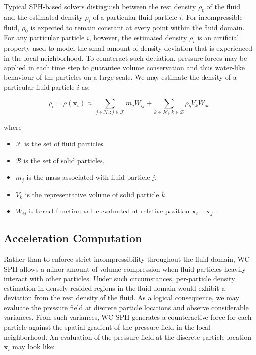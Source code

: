 \documentclass[
	11pt, 
	DIV10,
	ngerman,
	a4paper, 
	oneside, 
	headings=normal, 
	captions=tableheading,
	final, 
	numbers=noenddot
]{scrartcl}
\begin{document}
Typical SPH-based solvers distinguish between the rest density $ \rho_{0} $ of the fluid and the estimated density $ \rho_{i} $ of a particular fluid particle $ i $. For incompressible fluid, $ \rho_{0} $ is expected to remain constant at every point within the fluid domain. For any particular particle $ i $, however, the estimated density $ \rho_{i} $ is an artificial property used to model the small amount of density deviation that is experienced in the local neighborhood. To counteract such deviation, pressure forces may be applied in each time step to guarantee volume conservation and thus water-like behaviour of the particles on a large scale. We may estimate the density of a particular fluid particle $ i $ as:

\begin{equation}
    \label{eq13}
    \rho_{i} = \rho(\mathbf{x}_{i}) \approx \sum_{j \in \mathcal{N}_{i}:j \in \mathcal{F}} m_{j} W_{ij} + \sum_{k \in \mathcal{N}_{i}:k \in \mathcal{B}} \rho_{b} V_{k} W_{ik}
\end{equation}

where

\begin{itemize}
    \item $ \mathcal{F} $ is the set of fluid particles.
    \item $ \mathcal{B} $ is the set of solid particles.
    \item $ m_{j} $ is the mass associated with fluid particle $ j $.
    \item $ V_{k} $ is the representative volume of solid particle $ k $.
    \item $ W_{ij} $ is kernel function value evaluated at relative position $ \mathbf{x}_i - \mathbf{x}_j $.
\end{itemize}

\subsection{Acceleration Computation}

Rather than to enforce strict incompressibility throughout the fluid domain, WC-SPH allows a minor amount of volume compression when fluid particles heavily interact with other particles. Under such circumstances, per-particle density estimation in densely resided regions in the fluid domain would exhibit a deviation from the rest density of the fluid. As a logical consequence, we may evaluate the pressure field at discrete particle locations and observe considerable variances. From such variances, WC-SPH generates a counteractive force for each particle against the spatial gradient of the pressure field in the local neighborhood. An evaluation of the pressure field at the discrete particle location $ \boldsymbol{x}_{i} $ may look like:
\end{document}
